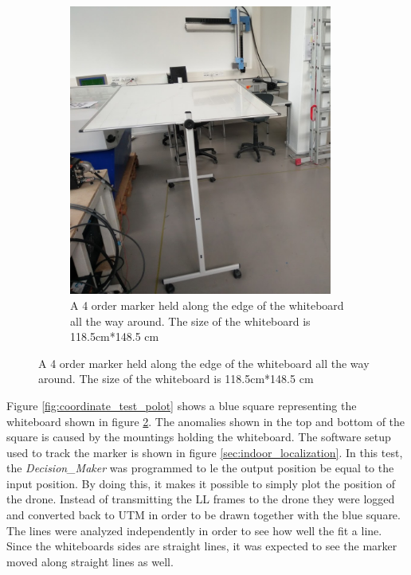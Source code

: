\begin{figure}[H]
\begin{subfigure}[b]{0.45\textwidth}
        \includegraphics[width=0.95\textwidth]{graphics/coordinate_test_setup.png}
        \caption{A 4 order marker held along the edge of the whiteboard all the way around. The size of the whiteboard is 118.5cm*148.5 cm}
        \label{fig:convert_test}
    \end{subfigure}
\end{figure}

Figure \ref{fig:coordinate_test_polot} shows a blue square representing the whiteboard shown in figure \ref{fig:convert_test}. The anomalies shown in the top and bottom of the square is caused by the mountings holding the whiteboard. The software setup used to track the marker is shown in figure \ref{sec:indoor_localization}.
In this test, the \textit{Decision\_Maker} was programmed to le the output position be equal to the input position.
By doing this, it makes it possible to simply plot the position of the drone. Instead of transmitting the \ac{LL} frames to the drone they were logged and converted back to UTM in order to be drawn together with the blue square.
The lines were analyzed independently in order to see how well the fit a line. Since the whiteboards sides are straight lines, it was expected to see the marker moved along straight lines as well.


